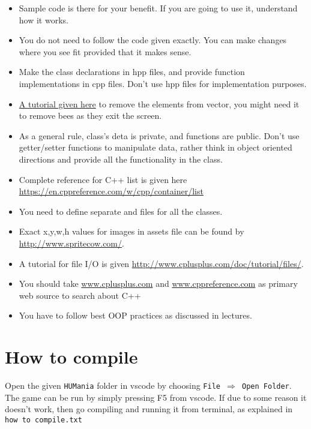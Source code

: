 \documentclass[a4paper,12pt]{article}
\begin{document}
\begin{itemize}
	\item Sample code is there for your benefit. If you are going to use it, understand how it works. 
	\item You do not need to follow the code given exactly. You can make changes where you see fit provided that it makes sense.
	\item Make the class declarations in hpp files, and provide function implementations in cpp files. Don't use hpp files for implementation purposes.
	\item \href{https://www.techiedelight.com/remove-elements-vector-inside-loop-cpp/}{A tutorial given here} to remove the elements from vector, you might need it to remove bees as they exit the screen.
	\item As a general rule, class's deta is private, and functions are public. Don't use getter/setter functions to manipulate data, rather think in object oriented directions and provide all the functionality in the class.
	\item Complete reference for C++ list is given here \url{https://en.cppreference.com/w/cpp/container/list}
	\item You need to define separate  and  files for all the classes.
	\item Exact x,y,w,h values for images in assets file can be found by \url{http://www.spritecow.com/}. 
	\item A tutorial for file I/O is given \url{http://www.cplusplus.com/doc/tutorial/files/}. 
	\item You should take \url{www.cplusplus.com} and \url{www.cppreference.com} as primary web source to search about C++
	\item You have to follow best OOP practices as discussed in lectures.
\end{itemize}

\section{How to compile}
Open the given \texttt{HUMania} folder in vscode by choosing \texttt{File $\Rightarrow$ Open Folder}. The game can be run by simply pressing F5 from vscode. If due to some reason it doesn't work, then go compiling and running it from terminal, as explained in \texttt{how to compile.txt}
\end{document}
